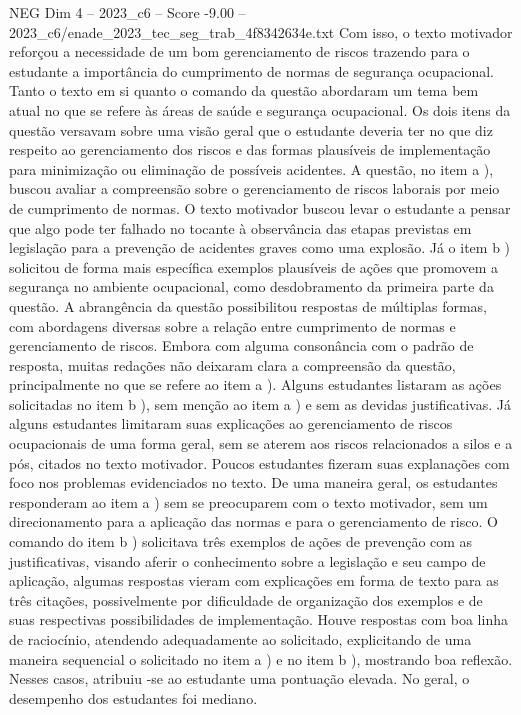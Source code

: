 \begin{textsample}{NEG Dim 4 – 2023\_c6 – Score -9.00 – 2023\_c6/enade\_2023\_tec\_seg\_trab\_4f8342634e.txt}
Com isso, o texto motivador reforçou a necessidade de um bom gerenciamento de riscos trazendo para o estudante a importância do cumprimento de normas de segurança ocupacional.
Tanto o texto em si quanto o comando da questão abordaram um tema bem atual no que se refere às áreas de saúde e segurança ocupacional.
Os dois itens da questão versavam sobre uma visão geral que o estudante deveria ter no que diz respeito ao gerenciamento dos riscos e das formas plausíveis de implementação para minimização ou eliminação de possíveis acidentes.
A questão, no item a ), buscou avaliar a compreensão sobre o gerenciamento de riscos laborais por meio de cumprimento de normas.
O texto motivador buscou levar o estudante a pensar que algo pode ter falhado no tocante à observância das etapas previstas em legislação para a prevenção de acidentes graves como uma explosão.
Já o item b ) solicitou de forma mais específica exemplos plausíveis de ações que promovem a segurança no ambiente ocupacional, como desdobramento da primeira parte da questão.
A abrangência da questão possibilitou respostas de múltiplas formas, com abordagens diversas sobre a relação entre cumprimento de normas e gerenciamento de riscos.
Embora com alguma consonância com o padrão de resposta, muitas redações não deixaram clara a compreensão da questão, principalmente no que se refere ao item a ).
Alguns estudantes listaram as ações solicitadas no item b ), sem menção ao item a ) e sem as devidas justificativas.
Já alguns estudantes limitaram suas explicações ao gerenciamento de riscos ocupacionais de uma forma geral, sem se aterem aos riscos relacionados a silos e a pós, citados no texto motivador.
Poucos estudantes fizeram suas explanações com foco nos problemas evidenciados no texto.
De uma maneira geral, os estudantes responderam ao item a ) sem se preocuparem com o texto motivador, sem um direcionamento para a aplicação das normas e para o gerenciamento de risco.
O comando do item b ) solicitava três exemplos de ações de prevenção com as justificativas, visando aferir o conhecimento sobre a legislação e seu campo de aplicação, algumas respostas vieram com explicações em forma de texto para as três citações, possivelmente por dificuldade de organização dos exemplos e de suas respectivas possibilidades de implementação.
Houve respostas com boa linha de raciocínio, atendendo adequadamente ao solicitado, explicitando de uma maneira sequencial o solicitado no item a ) e no item b ), mostrando boa reflexão.
Nesses casos, atribuiu -se ao estudante uma pontuação elevada.
No geral, o desempenho dos estudantes foi mediano.

\end{textsample}
